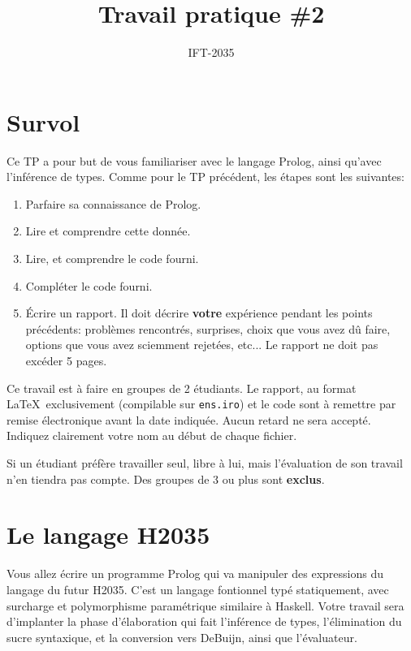 \documentclass{article}
\title{Travail pratique \#2}
\author{IFT-2035}
\renewcommand \: {\!:\!}
\begin{document}
\maketitle


\section{Survol}

Ce TP a pour but de vous familiariser avec le langage Prolog, ainsi qu'avec
l'inférence de types.
Comme pour le TP précédent, les étapes sont les suivantes:
\begin{enumerate}
\item Parfaire sa connaissance de Prolog.
\item Lire et comprendre cette donnée.
\item Lire, et comprendre le code fourni.
\item Compléter le code fourni.
\item Écrire un rapport.  Il doit décrire \textbf{votre} expérience pendant
  les points précédents: problèmes rencontrés, surprises, choix que vous
  avez dû faire, options que vous avez sciemment rejetées, etc...  Le
  rapport ne doit pas excéder 5 pages.
\end{enumerate}

Ce travail est à faire en groupes de 2 étudiants.  Le rapport, au format
\LaTeX\ exclusivement (compilable sur \texttt{ens.iro}) et le code sont
à remettre par remise électronique avant la date indiquée.  Aucun retard ne
sera accepté.  Indiquez clairement votre nom au début de chaque fichier.

Si un étudiant préfère travailler seul, libre à lui, mais l'évaluation de
son travail n'en tiendra pas compte.  Des groupes de 3 ou plus
sont \textbf{exclus}.

\section{Le langage H2035}

Vous allez écrire un programme Prolog qui va manipuler des expressions du
langage du futur H2035.  C'est un langage fontionnel typé statiquement, avec
surcharge et polymorphisme paramétrique similaire à Haskell.
Votre travail sera d'implanter la phase d'élaboration qui fait l'inférence
de types, l'élimination du sucre syntaxique, et la conversion vers DeBuijn,
ainsi que l'évaluateur.
\end{document}
